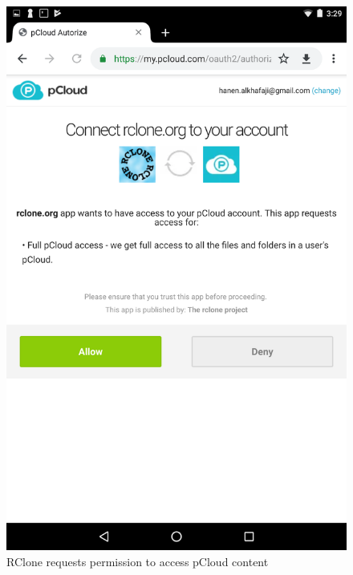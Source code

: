 \begin{figure}[htb]
  \centering
  \includegraphics[scale=0.2]{images/pcloud2.png}
  \caption{RClone requests permission to access pCloud content}
  \label{fig:pcloud2}
\end{figure}
